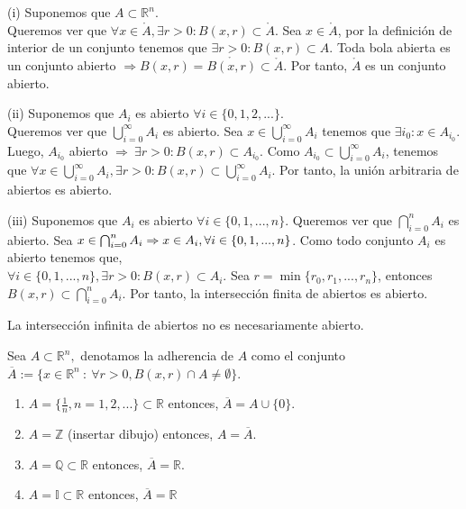 \begin{dem}(i)
     Suponemos que $A\subset\mathbb{R}^n$. \\ Queremos ver que $\forall x\in \mathring{A}, \exists r>0: B(x,r)\subset \mathring{A}$. Sea $x\in \mathring{A}$, por la definición de interior de un conjunto tenemos que $\exists r > 0: B(x,r) \subset A$. Toda bola abierta es un conjunto abierto $\Rightarrow B(x,r) = \mathring{B(x,r)} \subset \mathring{A}$. Por tanto, $\mathring{A}$ es un conjunto abierto.
\end{dem}
\begin{dem}(ii)
    Suponemos que $A_{i}$ es abierto $\forall i \in \{0,1,2,...\}$. \\ Queremos ver que $\bigcup_{i=0}^{\infty} A_{i}$ es abierto. Sea $x \in \bigcup_{i=0}^{\infty} A_{i}$ tenemos que $\exists i_{0}: x \in A_{i_{0}}$. Luego, $A_{i_{0}}$ abierto $ \Rightarrow \ \exists r > 0: B(x,r) \subset A_{i_{0}}$. Como $ A_{i_{0}} \subset \bigcup_{i=0}^{\infty} A_{i}$, tenemos que $\forall x\in \bigcup_{i=0}^{\infty} A_{i}, \exists r>0: B(x,r)\subset \bigcup_{i=0}^{\infty} A_{i}$. Por tanto, la unión arbitraria de abiertos es abierto.
\end{dem}
\begin{dem}(iii)
    Suponemos que $A_{i}$ es abierto  $\forall i \in \{0,1,...,n \}$. Queremos ver que $\bigcap_{i=0}^{n} A_{i}$ es abierto. Sea $x \in \bigcap_{i=0}^{n} A_{i} \Rightarrow x \in A_i ,\\ \forall i \in \{0,1,...,n\}$. Como todo conjunto $A_i$ es abierto tenemos que, \\$\forall i \in \{0,1,...,n\}, \exists r>0: B(x,r)\subset A_i$. Sea $r = \min \{r_0,r_1,...,r_n\}$, entonces $B(x,r)\subset \bigcap_{i=0}^{n} A_{i}$. Por tanto, la intersección finita de abiertos es abierto.
\end{dem}

\begin{obs}
La intersección infinita de abiertos no es necesariamente abierto.
\end{obs}

\begin{defn}[Adherencia]
Sea $A \subset \mathbb{R}^n, $ denotamos la adherencia de $A$ como el conjunto $ \overline{A} := \{ x \in \mathbb{R}^n \ : \ \forall r > 0, B(x,r)\cap A \neq \emptyset \} $.
\end{defn}

\begin{ejm}
\begin{enumerate}[label=(\roman*)]
    \item $A = \{ \frac{1}{n}, n = 1,2,...\} \subset \mathbb{R}$ entonces, $\overline{A} = A \cup \{0\}$.
    \item $ A = \mathbb{Z}$ (insertar dibujo) entonces, $ A = \overline{A}$.
    \item $A = \mathbb{Q} \subset \mathbb{R}$ entonces, $\overline{A} = \mathbb{R}$.
    \item $A = \mathbb{I}\subset\mathbb{R}$ entonces, $\overline{A} = \mathbb{R}$
\end{enumerate}
\end{ejm}

